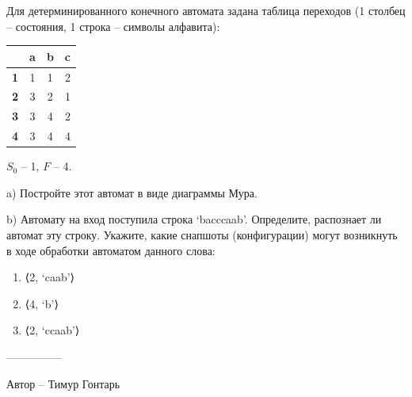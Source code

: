 \question
Для детерминированного конечного автомата задана таблица переходов (1 столбец – состояния, 1 строка – символы алфавита):

\begin{tabular}{||c | c |c| c||} 
 \hline
 & \textbf{a} & \textbf{b} & \textbf{c} \\ 
 \hline\hline
 \textbf{1} & 1& 1& 2\\ 
 \hline
 \textbf{2} & 3& 2& 1\\
 \hline
 \textbf{3} & 3& 4& 2\\
 \hline
 \textbf{4} & 3& 4& 4\\
 \hline
\end{tabular}

$S_0$ – 1, $F$ – {4}.

a) Постройте этот автомат в виде диаграммы Мура.

b) Автомату на вход поступила строка ‘bacccaab’. Определите, распознает ли автомат эту строку. Укажите, какие снапшоты (конфигурации) могут возникнуть в ходе обработки автоматом данного слова:

\begin{enumerate}
    \item ⟨2, ‘caab’⟩
    \item ⟨4, ‘b’⟩
    \item ⟨2, ‘ccaab’⟩
\end{enumerate}

---------------

Автор -- Тимур Гонтарь
